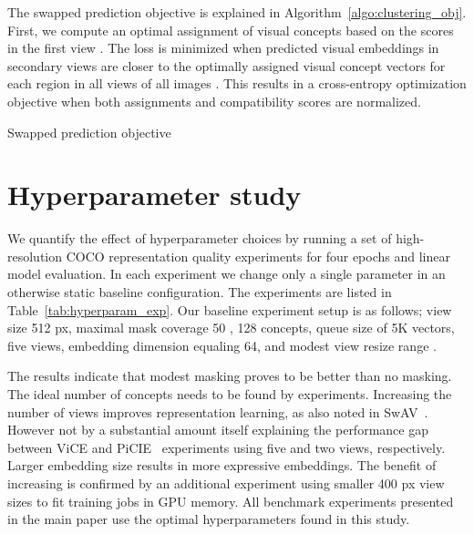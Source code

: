 \documentclass{bmvc2k}
\begin{document}
The swapped prediction objective is explained in Algorithm~\ref{algo:clustering_obj}. First, we compute an optimal assignment of visual concepts  based on the scores in the first view . The loss is minimized when predicted visual embeddings in secondary views  are closer to the optimally assigned visual concept vectors for each region  in all views  of all images . This results in a cross-entropy optimization objective when both assignments  and compatibility scores  are normalized.

\begin{algorithm}
\caption{Swapped prediction objective}
\label{algo:clustering_obj}
\begin{algorithmic}
\State 
\State 
\For{}
    \For{}
        \For{}
            \State 
            \State 
            \State 
            \State 
        \EndFor
        \State 
    \EndFor
\EndFor
\State 
\end{algorithmic}
\end{algorithm}

\section{Hyperparameter study}

We quantify the effect of hyperparameter choices by running a set of high-resolution COCO representation quality experiments for four epochs and linear model evaluation. In each experiment we change only a single parameter in an otherwise static baseline configuration. The experiments are listed in Table~\ref{tab:hyperparam_exp}. Our baseline experiment setup is as follows; view size 512 px, maximal mask coverage 50 , 128 concepts, queue size of 5K vectors, five views, embedding dimension  equaling 64, and modest view resize range .

The results indicate that modest masking proves to be better than no masking. The ideal number of concepts needs to be found by experiments. Increasing the number of views improves representation learning, as also noted in SwAV~\cite{Caron2020SwAV}. However not by a substantial amount itself explaining the performance gap between ViCE and PiCIE~\cite{Cho2021PiCIE} experiments using five and two views, respectively. Larger embedding size  results in more expressive embeddings. The benefit of increasing  is confirmed by an additional experiment using smaller 400 px view sizes to fit training jobs in GPU memory. All benchmark experiments presented in the main paper use the optimal hyperparameters found in this study.
\end{document}
